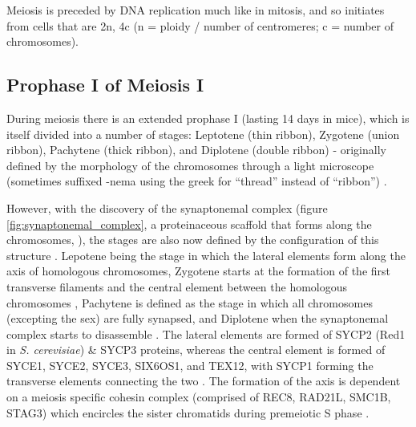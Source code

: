 Meiosis is preceded by DNA replication much like in mitosis, and so initiates from cells that are 2n, 4c (n = ploidy / number of centromeres; c = number of chromosomes).

\subsection{Prophase I of Meiosis I}
During meiosis there is an extended prophase I (lasting 14 days in mice), which is itself divided into a number of stages: Leptotene (thin ribbon), Zygotene (union ribbon), Pachytene (thick ribbon), and Diplotene (double ribbon) - originally defined by the morphology of the chromosomes through a light microscope (sometimes suffixed -nema using the greek for ``thread'' instead of ``ribbon'') \parencite{DeWiniwarter1900Recherches, Gregoire1907formation, Wilson1912Studies, Zickler1998leptotenezygotene}.

However, with the discovery of the synaptonemal complex (figure \ref{fig:synaptonemal_complex}, a proteinaceous scaffold that forms along the chromosomes, \cite{Moses1956Chromosomal, Fawcett1956FINE}), the stages are also now defined by the configuration of this structure \parencite{Zickler2015Recombination}.
Lepotene being the stage in which the lateral elements form along the axis of homologous chromosomes, Zygotene starts at the formation of the first transverse filaments and the central element between the homologous chromosomes \parencite{Moens1968structure}, Pachytene is defined as the stage in which all chromosomes (excepting the sex) are fully synapsed, and Diplotene when the synaptonemal complex starts to disassemble \parencite{Moses1958Relation, Moses1977Synaptonemal}.
The lateral elements are formed of SYCP2 (Red1 in \textit{S. cerevisiae}) \& SYCP3 proteins, whereas the central element is formed of SYCE1, SYCE2, SYCE3, SIX6OS1, and TEX12, with SYCP1 forming the transverse elements connecting the two \parencite[reviewed in][]{Zickler2015Recombination, Gao2018Zipping, Kaniecki2018change, Dunce2018Structural}.
The formation of the axis is dependent on a meiosis specific cohesin complex (comprised of REC8, RAD21L, SMC1B, STAG3) which encircles the sister chromatids during premeiotic S phase \parencite[reviewed in][]{Rankin2015Complex, Ishiguro2019cohesin}.

